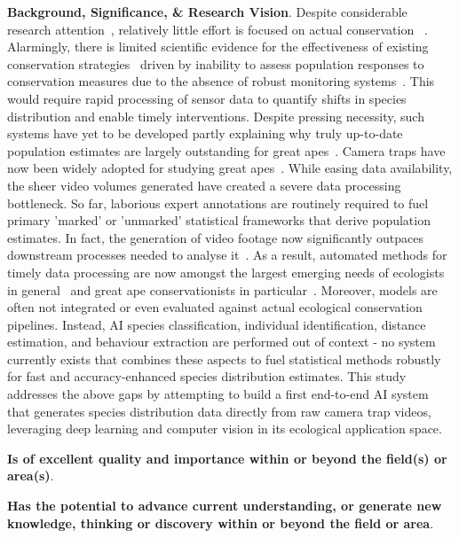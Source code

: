 \textbf{Background, Significance, \& Research Vision}. Despite considerable research attention~\cite{Marshall2016}, relatively little effort is focused on actual conservation ~\cite{Bezanson2019}. Alarmingly, there is limited scientific evidence for the effectiveness of existing conservation strategies~\cite{Junker2020,Junker2017} driven by inability to assess population responses to conservation measures due to the absence of robust monitoring systems~\cite{Witmer2005,Junker2020}. This would require rapid  processing of sensor data to quantify shifts in species distribution and enable timely interventions. Despite pressing necessity, such systems have yet to be developed partly explaining why truly up-to-date population estimates are largely outstanding for great apes~\cite{Campbell2008, Walsh2008, Plumptre2010, Morgan2011, ArcusFoundation2014, Humle2016}. Camera traps have now been widely adopted for studying great apes~\cite{Burton2015, Tuia2022}. While easing data availability, the sheer video volumes generated have created a severe data processing bottleneck. So far, laborious expert annotations are routinely required to fuel primary 'marked' or 'unmarked' statistical frameworks that derive population estimates. In fact, the generation of video footage now significantly outpaces downstream processes needed to analyse it~\cite{Hebblewhite2010, Burton2015, Tuia2022, Pollock2025}. As a result, automated methods for timely data processing are now amongst the largest emerging needs of ecologists in general~\cite{Nathan2022} and great ape conservationists in particular~\cite{}. Moreover, models are often not integrated or even evaluated against actual ecological conservation pipelines. Instead, AI species classification, individual identification, distance estimation, and behaviour extraction are performed out of context - no system currently exists that combines these aspects to fuel statistical methods robustly for fast and accuracy-enhanced species distribution estimates. This study addresses the above gaps by attempting to build a first end-to-end AI system that generates species distribution data directly from raw camera trap videos, leveraging deep learning and computer vision in its ecological application space.

\textbf{Is of excellent quality and importance within or beyond the field(s) or area(s)}.

\textbf{Has the potential to advance current understanding, or generate new knowledge, thinking or discovery within or beyond the field or area}.

